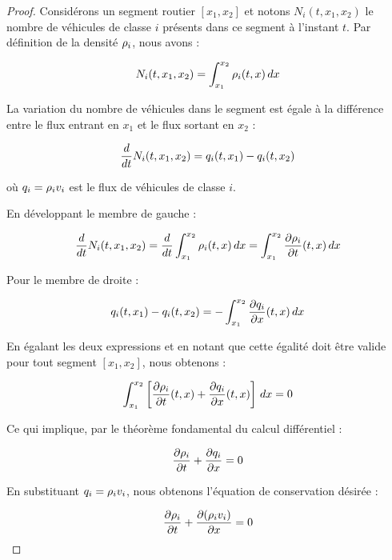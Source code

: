 \begin{proof}
Considérons un segment routier $[x_1, x_2]$ et notons $N_i(t, x_1, x_2)$ le nombre de véhicules de classe $i$ présents dans ce segment à l'instant $t$. Par définition de la densité $\rho_{i}$, nous avons :

\begin{equation}
N_i(t, x_1, x_2) = \int_{x_1}^{x_2} \rho_{i}(t,x) \, dx
\end{equation}

La variation du nombre de véhicules dans le segment est égale à la différence entre le flux entrant en $x_1$ et le flux sortant en $x_2$ :

\begin{equation}
\frac{d}{dt}N_i(t, x_1, x_2) = q_{i}(t,x_1) - q_{i}(t,x_2)
\end{equation}

où $q_{i} = \rho_{i}v_{i}$ est le flux de véhicules de classe $i$.

En développant le membre de gauche :

\begin{equation}
\frac{d}{dt}N_i(t, x_1, x_2) = \frac{d}{dt}\int_{x_1}^{x_2} \rho_{i}(t,x) \, dx = \int_{x_1}^{x_2} \frac{\partial \rho_{i}}{\partial t}(t,x) \, dx
\end{equation}

Pour le membre de droite :

\begin{equation}
q_{i}(t,x_1) - q_{i}(t,x_2) = -\int_{x_1}^{x_2} \frac{\partial q_{i}}{\partial x}(t,x) \, dx
\end{equation}

En égalant les deux expressions et en notant que cette égalité doit être valide pour tout segment $[x_1, x_2]$, nous obtenons :

\begin{equation}
\int_{x_1}^{x_2} \left[ \frac{\partial \rho_{i}}{\partial t}(t,x) + \frac{\partial q_{i}}{\partial x}(t,x) \right] \, dx = 0
\end{equation}

Ce qui implique, par le théorème fondamental du calcul différentiel :

\begin{equation}
\frac{\partial \rho_{i}}{\partial t} + \frac{\partial q_{i}}{\partial x} = 0
\end{equation}

En substituant $q_{i} = \rho_{i}v_{i}$, nous obtenons l'équation de conservation désirée :

\begin{equation}
\frac{\partial \rho_{i}}{\partial t} + \frac{\partial (\rho_{i}v_{i})}{\partial x} = 0
\end{equation}
\end{proof}

